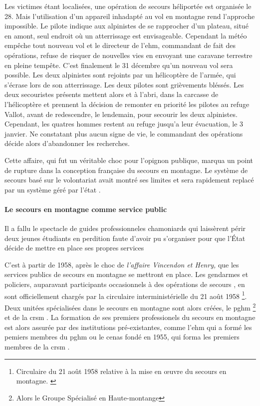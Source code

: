 Les victimes étant localisées, une opération de secours héliportée est
organisée le 28. Mais l'utilisation d'un appareil inhadapté au vol en
montagne rend l'approche impossible. Le pilote indique aux alpinistes
de se rapprocher d'un plateau, situé en amont, seul endroit où un
atterrissage est envisageable. Cependant la météo empêche tout nouveau
vol et le directeur de l'\ac{ehm}, commandant de fait des opérations,
refuse de risquer de nouvelles vies en envoyant une caravane terrestre
en pleine tempête. C'est finalement le 31 décembre qu'un nouveau vol
sera possible. Les deux alpinistes sont rejoints par un hélicoptère de
l'armée, qui s'écrase lors de son atterrissage. Les deux pilotes sont
grièvements bléssés. Les deux secouristes présents mettent alors
 et  à l'abri, dans la carcasse de
l'hélicoptère et prennent la décision de remonter en priorité les
pilotes au refuge Vallot, avant de redescendre, le lendemain, pour
secourir les deux alpinistes. Cependant, les quatres hommes restent au
refuge jusqu'a leur évacuation, le 3 janvier. Ne constatant plus aucun
signe de vie, le commandant des opérations décide alors d'abandonner
les recherches.

Cette affaire, qui fut un véritable choc pour l'opignon publique,
marqua un point de rupture dans la conception française du secours en
montagne. Le système de secours basé sur le volontariat avait montré
ses limites et sera rapidement replacé par un système géré par l'état
\autocite{Ballu1997}.

\paragraph{Le secours en montagne comme service public}
\label{par:1-1-1-1-2}

\begin{displayquote}
  \og Il a fallu le spectacle de guides professionneles chamoniards
  qui laissèrent périr deux jeunes étudiants en perdition faute
  d'avoir pu s'organiser pour que l'État décide de mettre en place ses
  propres services \textelp{}\fg{} \autocite{Descamps2018}
\end{displayquote}

C'est à partir de 1958, après le choc de \emph{l'affaire Vincendon et
  Henry,} que les services publics de secours en montagne se mettront
en place. Les gendarmes et policiers, auparavant participants
occasionnels à des opérations de secours
\autocite{Mollaret2016,CFDLD}, en sont officiellement chargés par la
circulaire interministérielle du 21 août 1958 \footnote{Circulaire  du 21 août 1958 relative à la mise en œuvre du secours en
  montagne. \label{fn:circulaire_21_aout_58}}. Deux unitées
spécialisées dans le secours en montagne sont alors créées, le
\ac{pghm} \footnote{Alors le Groupe Spécialisé en Haute-montange} et
de la \ac{crsm} \autocite{Halle2007}. La formation de ses premiers
professionels du secours en montagne est alors assurée par des
institutions pré-existantes, comme l'\ac{ehm} qui a formé les pemiers
membres du \ac{pghm} ou le \ac{cenas} fondé en 1955, qui forma les
premiers membres de la \ac{crsm} \autocite{Mezin2016}.

